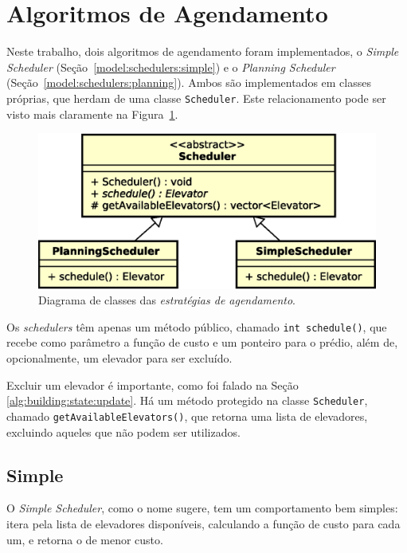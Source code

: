 \section{\label{model:schedulers}Algoritmos de Agendamento}

Neste trabalho, dois algoritmos de agendamento foram implementados, o
\textit{Simple Scheduler} (Seção~\ref{model:schedulers:simple}) e o
\textit{Planning Scheduler} (Seção~\ref{model:schedulers:planning}). Ambos são
implementados em classes próprias, que herdam de uma classe \texttt{Scheduler}.
Este relacionamento pode ser visto mais claramente na
Figura~\ref{fig:model:schedulers:uml:base}.

\begin{figure}[htb!]
  \centering
  \includegraphics[scale=0.6]{img/Scheduler}
  \caption{Diagrama de classes das \textit{estratégias de agendamento}.}
  \label{fig:model:schedulers:uml:base}
\end{figure}

Os \textit{schedulers} têm apenas um método público, chamado \texttt{int
 schedule()}, que recebe como parâmetro a função de custo e um ponteiro para o
prédio, além de, opcionalmente, um elevador para ser excluído.

Excluir um elevador é importante, como foi falado na Seção
\ref{alg:building:state:update}. Há um método protegido na classe
\texttt{Scheduler}, chamado \texttt{getAvailableElevators()}, que retorna uma
lista de elevadores, excluindo aqueles que não podem ser utilizados.


\subsection{\label{model:schedulers:simple}Simple}
O \textit{Simple Scheduler}, como o nome sugere, tem um comportamento bem
simples: itera pela lista de elevadores disponíveis, calculando a função de
custo para cada um, e retorna o de menor custo.

